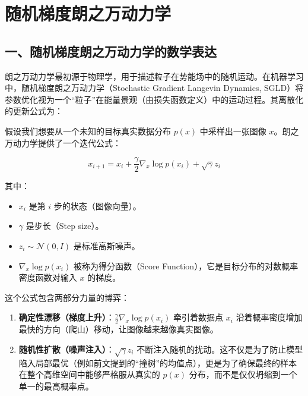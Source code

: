 \setcounter{section}{1}

\hypertarget{ux968fux673aux68afux5ea6ux6717ux4e4bux4e07ux52a8ux529bux5b66}{%
\section{随机梯度朗之万动力学}\label{ux968fux673aux68afux5ea6ux6717ux4e4bux4e07ux52a8ux529bux5b66}}

\hypertarget{ux4e00ux968fux673aux68afux5ea6ux6717ux4e4bux4e07ux52a8ux529bux5b66ux7684ux6570ux5b66ux8868ux8fbe}{%
\subsection{一、随机梯度朗之万动力学的数学表达}\label{ux4e00ux968fux673aux68afux5ea6ux6717ux4e4bux4e07ux52a8ux529bux5b66ux7684ux6570ux5b66ux8868ux8fbe}}

朗之万动力学最初源于物理学，用于描述粒子在势能场中的随机运动。在机器学习中，随机梯度朗之万动力学（Stochastic Gradient Langevin Dynamics, SGLD）将参数优化视为一个``粒子''在能量景观（由损失函数定义）中的运动过程。其离散化的更新公式为：

假设我们想要从一个未知的目标真实数据分布 \(p(x)\) 中采样出一张图像 \(x\)。朗之万动力学提供了一个迭代公式：

\[
x_{i+1}=x_i+\frac{\gamma}{2}\nabla_x\log p(x_i)+\sqrt{\gamma}z_i
\]

其中：

\begin{itemize}
\tightlist
\item
  \(x_i\) 是第 \(i\) 步的状态（图像向量）。
\item
  \(\gamma\) 是步长（Step size）。
\item
  \(z_i\sim\mathcal{N}(0,I)\) 是标准高斯噪声。
\item
  \(\nabla_x\log p(x_i)\) 被称为得分函数（Score Function），它是目标分布的对数概率密度函数对输入 \(x\) 的梯度。
\end{itemize}

这个公式包含两部分力量的博弈：

\begin{enumerate}
\def\labelenumi{\arabic{enumi}.}
\tightlist
\item
  \textbf{确定性漂移（梯度上升）}：\(\frac{\gamma}{2}\nabla_x\log p(x_i)\) 牵引着数据点 \(x_i\) 沿着概率密度增加最快的方向（爬山）移动，让图像越来越像真实图像。
\item
  \textbf{随机性扩散（噪声注入）}：\(\sqrt{\gamma}z_i\) 不断注入随机的扰动。这不仅是为了防止模型陷入局部最优（例如前文提到的``撞树''的均值点），更是为了确保最终的样本在整个高维空间中能够严格服从真实的 \(p(x)\) 分布，而不是仅仅坍缩到一个单一的最高概率点。
\end{enumerate}

